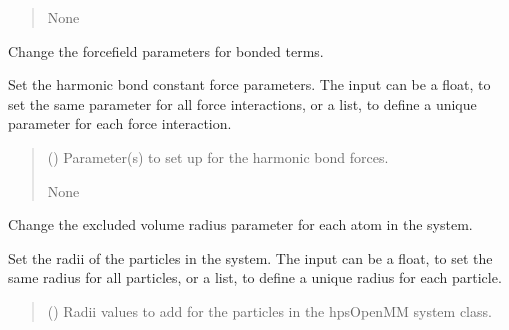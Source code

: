 \documentclass[letterpaper,10pt,english]{sphinxmanual}
\begin{document}
\begin{fulllineitems}
\begin{fulllineitems}
\begin{quote}
\begin{description}
\sphinxAtStartPar
None

\end{description}\end{quote}

\end{fulllineitems}


\begin{fulllineitems}
\label{\detokenize{modules/system:hps.core.system.setBondForceConstants}}
\pysigstartsignatures
{}
\pysigstopsignatures
\sphinxAtStartPar
Change the forcefield parameters for bonded terms.

\sphinxAtStartPar
Set the harmonic bond constant force parameters. The input can be
a float, to set the same parameter for all force interactions, or
a list, to define a unique parameter for each force interaction.
\begin{quote}\begin{description}
\sphinxAtStartPar
{} () \textendash{} Parameter(s) to set up for the harmonic bond forces.

\sphinxAtStartPar
None

\end{description}\end{quote}

\end{fulllineitems}


\begin{fulllineitems}
\label{\detokenize{modules/system:hps.core.system.setParticlesRadii}}
\pysigstartsignatures
{}
\pysigstopsignatures
\sphinxAtStartPar
Change the excluded volume radius parameter for each atom in the system.

\sphinxAtStartPar
Set the radii of the particles in the system. The input can be a
float, to set the same radius for all particles, or a list, to define
a unique radius for each particle.
\begin{quote}\begin{description}
\sphinxAtStartPar
{} () \textendash{} Radii values to add for the particles in the hpsOpenMM system class.


\end{description}
\end{quote}
\end{fulllineitems}
\end{fulllineitems}
\end{document}
